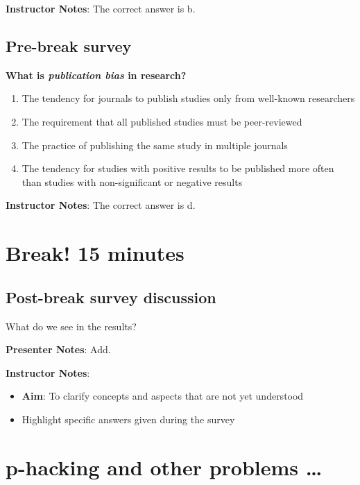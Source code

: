 \documentclass[
  letterpaper,
  DIV=11,
  numbers=noendperiod]{scrartcl}
\begin{document}
\textbf{Instructor Notes}: The correct answer is b.

\subsection{Pre-break survey}\label{pre-break-survey-3}

\textbf{What is \emph{publication bias} in research?}

\begin{enumerate}
\def\labelenumi{\alph{enumi}.}
\item
  The tendency for journals to publish studies only from well-known
  researchers
\item
  The requirement that all published studies must be peer-reviewed
\item
  The practice of publishing the same study in multiple journals
\item
  The tendency for studies with positive results to be published more
  often than studies with non-significant or negative results
\end{enumerate}

\textbf{Instructor Notes}: The correct answer is d.~

\section{Break! 15 minutes}\label{break-15-minutes}

\subsection{Post-break survey
discussion}\label{post-break-survey-discussion}

What do we see in the results?

\textbf{Presenter Notes}: Add.

\textbf{Instructor Notes}:

\begin{itemize}
\item
  \textbf{Aim}: To clarify concepts and aspects that are not yet
  understood
\item
  Highlight specific answers given during the survey
\end{itemize}

\section{p-hacking and other problems
\ldots{}}\label{p-hacking-and-other-problems}
\end{document}
